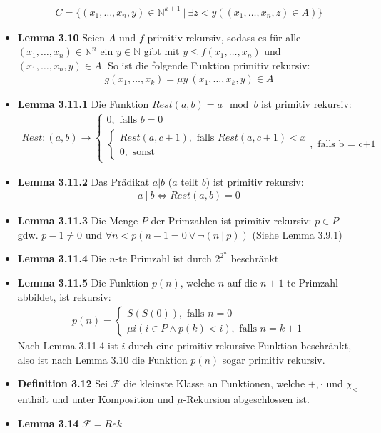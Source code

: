 \documentclass{scrartcl}
\begin{document}
\begin{itemize}
    \begin{align*}
        C = \{(x_1, \hdots, x_n,y)\in \mathbb{N}^{k+1}\ |\ \exists z < y ((x_1, \hdots, x_n, z) \in A)\}
    \end{align*}
    \item{\textbf{Lemma 3.10}} Seien $A$ und $f$ primitiv rekursiv, sodass es für alle $(x_1, \hdots, x_n) \in \mathbb{N}^n$ ein $y \in \mathbb{N}$ gibt mit $y \leq f(x_1, \hdots, x_n)$ und $(x_1, \hdots, x_n,y) \in A$. So ist die folgende Funktion primitiv rekursiv:
    \begin{align*}
        g(x_1, \hdots, x_k) = \mu y\ (x_1,\hdots, x_k, y) \in A
    \end{align*}
    \item{\textbf{Lemma 3.11.1}} Die Funktion $Rest(a,b) = a\mod b$ ist primitiv rekursiv:
    \begin{align*}
        Rest: (a,b) \to 
        \begin{cases}
        0, \text{ falls } b = 0\\
        \begin{cases}
            Rest(a,c+1), \text{ falls } Rest(a,c+1) < x\\
            0, \text{ sonst }
        \end{cases},
        \text{ falls b = c+1}
        \end{cases}
    \end{align*}
    \item{\textbf{Lemma 3.11.2}} Das Prädikat $a | b$ ($a$ teilt $b$) ist primitiv rekursiv:
    \begin{align*}
        a\ |\ b \Leftrightarrow Rest(a,b) = 0
    \end{align*}
    \item{\textbf{Lemma 3.11.3}} Die Menge $P$ der Primzahlen ist primitiv rekursiv: $p \in P$ gdw. $p-1 \neq 0$ und $\forall n < p(n-1 = 0 \vee \neg(n\ |\ p))$ (Siehe Lemma 3.9.1)
    \item{\textbf{Lemma 3.11.4}} Die $n$-te Primzahl ist durch $2^{2^n}$ beschränkt
    \item{\textbf{Lemma 3.11.5}} Die Funktion $p(n)$, welche $n$ auf die $n+1$-te Primzahl abbildet, ist rekursiv:
    \begin{align*}
        p(n) = 
        \begin{cases}
        S(S(0)), \text{ falls } n = 0\\
        \mu i (i \in P \wedge p(k) < i), \text{ falls } n = k+1
        \end{cases}
    \end{align*}
    Nach Lemma 3.11.4 ist $i$ durch eine primitiv rekursive Funktion beschränkt, also ist nach Lemma 3.10 die Funktion $p(n)$ sogar primitiv rekursiv.
    \item{\textbf{Definition 3.12}} Sei $\mathcal{F}$ die kleinste Klasse an Funktionen, welche $+, \cdot$ und $\chi_{<}$ enthält und unter Komposition und $\mu$-Rekursion abgeschlossen ist.
    \item{\textbf{Lemma 3.14}} $\mathcal{F} = Rek$
\end{itemize}
\end{document}
